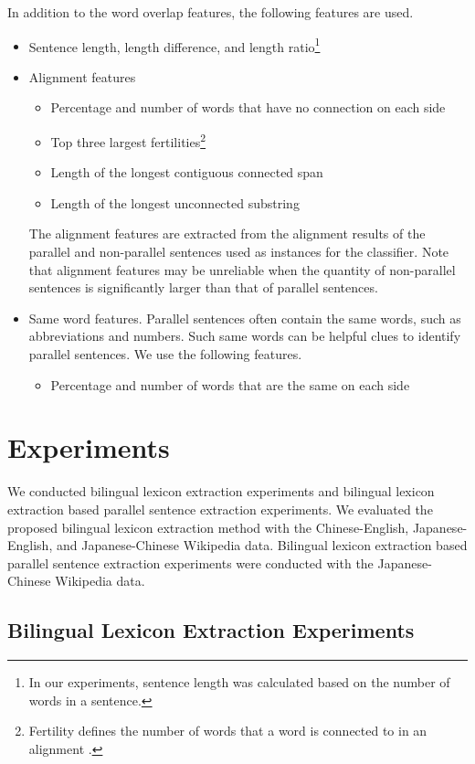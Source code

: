 \documentclass[english]{jnlp_1.4}
\begin{document}
 In addition to the word overlap features,
the following features are used.
\begin{itemize}
\item Sentence length, length difference, and length ratio\footnote{In our 
experiments, sentence length was calculated based on the number of words in a sentence.}
\item Alignment features
\begin{itemize}
\item Percentage and number of words that have no connection on each side
\item Top three largest fertilities\footnote{Fertility defines the number of words that a word 
is connected to in an alignment \cite{brown-EtAl:1993}.}
\item Length of the longest contiguous connected span
\item Length of the longest unconnected substring
\end{itemize}
The alignment features are extracted from the alignment results of the 
parallel and non-parallel sentences used as instances for the classifier. 
Note that alignment features may be unreliable when the quantity of
non-parallel sentences is significantly larger than that of parallel sentences.
\item Same word features. Parallel sentences often contain the same words, 
such as abbreviations and numbers. Such same words can be helpful clues to identify parallel sentences.
We use the following features.
\begin{itemize}
\item Percentage and number of words that are the same on each side
\end{itemize}
\end{itemize}


\section{Experiments}

We conducted bilingual lexicon extraction experiments and bilingual lexicon extraction 
based parallel sentence extraction experiments. We evaluated the proposed bilingual lexicon 
extraction method with the Chinese-English, Japanese-English, and Japanese-Chinese Wikipedia 
data. Bilingual lexicon extraction based parallel sentence extraction experiments were conducted 
with the Japanese-Chinese Wikipedia data.


\subsection{Bilingual Lexicon Extraction Experiments}
\label{lexicon_sec:experiments}
\end{document}
